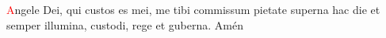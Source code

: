 \textcolor{red}{A}ngele Dei, qui custos es mei, me tibi commissum pietate superna hac die et semper illumina, custodi, rege et guberna. Amén
